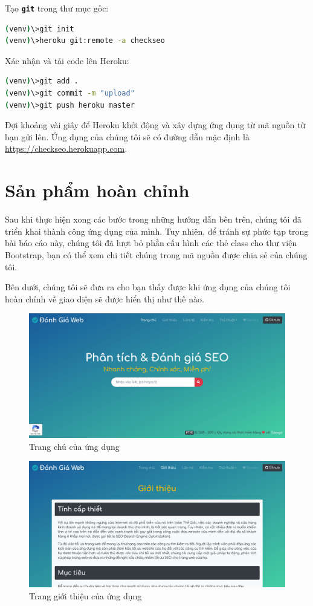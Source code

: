 \par
Tạo \textbf{\texttt{git}} trong thư mục gốc:
\begin{lstlisting}[language=bash]
(venv)\>git init
(venv)\>heroku git:remote -a checkseo
\end{lstlisting}
\par
Xác nhận và tải code lên Heroku:
\begin{lstlisting}[language=bash]
(venv)\>git add .
(venv)\>git commit -m "upload"
(venv)\>git push heroku master
\end{lstlisting}
\par
Đợi khoảng vài giây để Heroku khởi động và xây dựng ứng dụng từ mã nguồn từ bạn gửi lên. Ứng dụng của chúng tôi sẽ có đường dẵn mặc định là \url{https://checkseo.herokuapp.com}.
\section{Sản phẩm hoàn chỉnh}
Sau khi thực hiện xong các bước trong những hướng dẫn bên trên, chúng tôi đã triển khai thành công ứng dụng của mình. Tuy nhiên, để tránh sự phức tạp trong bài báo cáo này, chúng tôi đã lượt bỏ phần cấu hình các thẻ class cho thư viện Bootstrap, bạn có thể xem chi tiết chúng trong mã nguồn được chia sẻ của chúng tôi.
\par
Bên dưới, chúng tôi sẽ đưa ra cho bạn thấy được khi ứng dụng của chúng tôi hoàn chỉnh về giao diện sẽ được hiển thị như thế nào.
\begin{center}
    \begin{figure}[!ht]
        \centering
        \includegraphics[width=120mm]{images/trang-chu.png}
        \caption{Trang chủ của ứng dụng}
    \end{figure}
\end{center}
\begin{center}
    \begin{figure}[!ht]
        \centering
        \includegraphics[width=120mm]{images/trang-gioi-thieu.png}
        \caption{Trang giới thiệu của ứng dụng}
    \end{figure}
\end{center}
